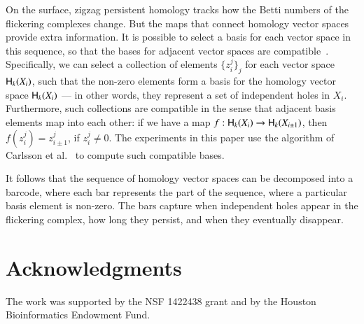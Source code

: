 \documentclass[12pt,tightenlines]{revtex4}
\newcommand{\Hgr}{{\sf H}}
\begin{document}
On the surface, zigzag persistent homology tracks how the Betti numbers of the flickering complexes change. But the maps that 
connect homology vector spaces provide extra information. It is possible to select a basis for each vector space in this sequence, 
so that the bases for adjacent vector spaces are compatible~\cite{Carlsson1}. Specifically, we can select a collection of elements 
$\{ z_i^j \}_j$ for each vector space $\Hgr_k(X_i)$, such that the non-zero elements form a basis for the homology vector space 
$\Hgr_k(X_i)$ --- in other words, they represent a set of independent holes in $X_i$. Furthermore, such collections are compatible 
in the sense that adjacent basis elements map into each other: if we have a map $f: \Hgr_k(X_i) \to \Hgr_k(X_{i\pm1})$, then 
$f(z_i^j) = z_{i\pm1}^j$, if $z_i^j \neq 0$. The experiments in this paper use the algorithm of Carlsson et al.~\cite{Carlsson2} to 
compute such compatible bases.

It follows that the sequence of homology vector spaces can be decomposed into a barcode, where each bar represents the part 
of the sequence, where a particular basis element is non-zero. The bars capture when independent holes appear in the flickering 
complex, how long they persist, and when they eventually disappear.

\section{Acknowledgments}
\label{section:acknow}

The work was supported by the NSF 1422438 grant and by the Houston Bioinformatics Endowment Fund.
\end{document}
